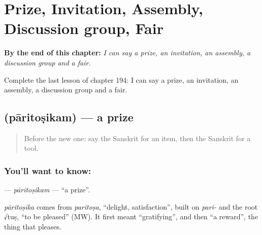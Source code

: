 
\chapter{Prize, Invitation, Assembly, Discussion group, Fair}
\label{ch:sa-prize-invitation-assembly-discussion-group-fair}

\begin{chapteropening}
\textbf{By the end of this chapter:} \emph{I can say a prize, an invitation, an assembly, a discussion group and a fair.}

Complete the last lesson of chapter 194: I can say a prize, an invitation, an assembly, a discussion group and a fair.
\end{chapteropening}

\section[\texorpdfstring{\sk{पारितोषिकम्} (pāritoṣikam)}{पारितोषिकम् (pāritoṣikam)}]{ (pāritoṣikam) — a prize}

\label{lesson:SA-C194-paritosikam}



\begin{quote}
Before the new one: say the Sanskrit for an item, then the Sanskrit for a tool.
\end{quote}

\subsection*{You'll want to know: }
\textbf{} — \emph{pāritoṣikam} — \textquotedblleft{}a prize\textquotedblright{}.

\begin{cousinweb}
\emph{pāritoṣika} comes from \emph{paritoṣa}, \textquotedblleft{}delight, satisfaction\textquotedblright{}, built on \emph{pari-} and the root √tuṣ, \textquotedblleft{}to be pleased\textquotedblright{} (MW). It first meant \textquotedblleft{}gratifying\textquotedblright{}, and then \textquotedblleft{}a reward\textquotedblright{}, the thing that pleases.
\end{cousinweb}

